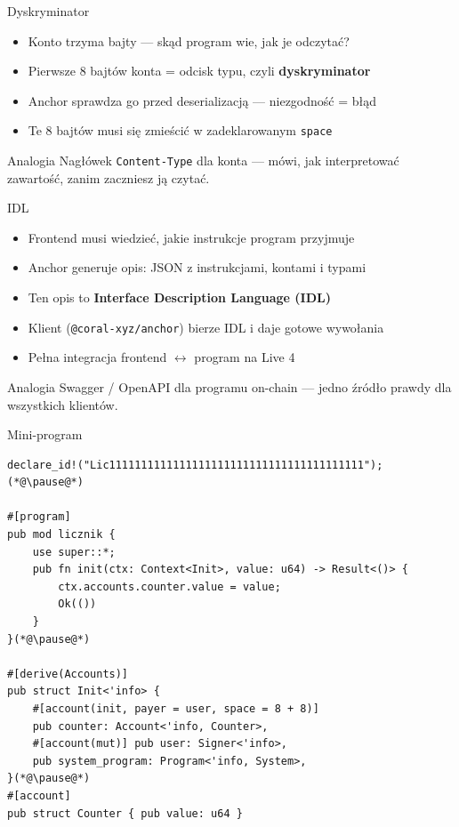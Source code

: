 \begin{frame}{Dyskryminator}
  \begin{itemize}
    \item Konto trzyma bajty --- skąd program wie, jak je odczytać?
    \item Pierwsze 8 bajtów konta = odcisk typu, czyli \textbf{dyskryminator}
    \item Anchor sprawdza go przed deserializacją --- niezgodność = błąd
    \item Te 8 bajtów musi się zmieścić w zadeklarowanym \texttt{space}
  \end{itemize}
  \vspace{0.25cm}
  \begin{block}{Analogia}
    Nagłówek \texttt{Content-Type} dla konta --- mówi, jak interpretować zawartość,
    zanim zaczniesz ją czytać.
  \end{block}
\end{frame}

\begin{frame}{IDL}
  \begin{itemize}
    \item Frontend musi wiedzieć, jakie instrukcje program przyjmuje
    \item Anchor generuje opis: JSON z instrukcjami, kontami i typami
    \item Ten opis to \textbf{Interface Description Language (IDL)}
    \item Klient (\texttt{@coral-xyz/anchor}) bierze IDL i daje gotowe wywołania
    \item Pełna integracja frontend $\leftrightarrow$ program na Live 4
  \end{itemize}
  \vspace{0.25cm}
  \begin{exampleblock}{Analogia}
    Swagger / OpenAPI dla programu on-chain --- jedno źródło prawdy
    dla wszystkich klientów.
  \end{exampleblock}
\end{frame}

\begin{frame}[fragile]{Mini-program}
\begin{lstlisting}
declare_id!("Lic1111111111111111111111111111111111111111");(*@\pause@*)

#[program]
pub mod licznik {
    use super::*;
    pub fn init(ctx: Context<Init>, value: u64) -> Result<()> {
        ctx.accounts.counter.value = value;
        Ok(())
    }
}(*@\pause@*)

#[derive(Accounts)]
pub struct Init<'info> {
    #[account(init, payer = user, space = 8 + 8)]
    pub counter: Account<'info, Counter>,
    #[account(mut)] pub user: Signer<'info>,
    pub system_program: Program<'info, System>,
}(*@\pause@*)
#[account]
pub struct Counter { pub value: u64 }
\end{lstlisting}
\end{frame}

